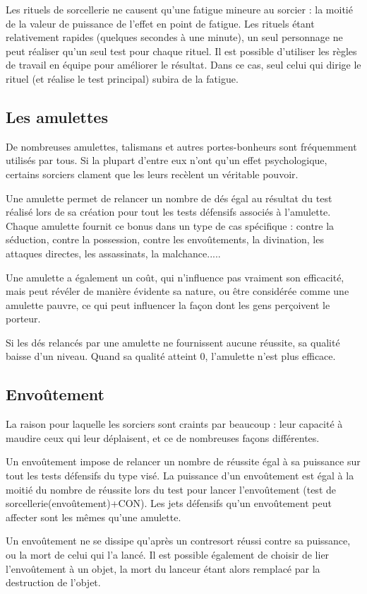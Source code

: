 \documentclass[10pt,a4paper,twocolumn]{book}
\begin{document}
Les rituels de sorcellerie ne causent qu'une fatigue mineure au  sorcier : la moitié de la valeur de puissance de l'effet en point de fatigue.
Les rituels étant relativement rapides (quelques secondes à une minute), un seul personnage ne peut réaliser qu'un seul test pour chaque rituel. Il est possible d'utiliser les règles de travail en équipe pour améliorer le résultat. Dans ce cas, seul celui qui dirige le rituel (et réalise le test principal) subira de la fatigue.
\subsection*{Les amulettes}
De nombreuses amulettes, talismans et autres portes-bonheurs sont fréquemment utilisés par tous. Si la plupart d'entre eux n'ont qu'un effet psychologique, certains sorciers clament que les leurs recèlent un véritable pouvoir.

Une amulette permet de relancer un nombre de dés égal au résultat du test réalisé lors de sa création pour tout les tests défensifs associés à l'amulette. Chaque amulette fournit ce bonus dans un type de cas spécifique : contre la séduction, contre la possession, contre les envoûtements, la divination, les attaques directes, les assassinats, la malchance..... 

Une amulette a également un coût, qui n'influence pas vraiment son efficacité, mais peut révéler de manière évidente sa nature, ou être considérée comme une amulette pauvre, ce qui peut influencer la façon dont les gens perçoivent le porteur.

Si les dés relancés par une amulette ne fournissent aucune réussite, sa qualité baisse d'un niveau. Quand sa qualité atteint 0, l'amulette n'est plus efficace. 
\subsection*{Envoûtement}
La raison pour laquelle les sorciers sont craints par beaucoup : leur capacité à maudire ceux qui leur déplaisent, et ce de nombreuses façons différentes.

Un envoûtement impose de relancer un nombre de réussite égal à sa puissance sur tout les tests défensifs du type visé. La puissance d'un envoûtement est égal à la moitié du nombre de réussite lors du test pour lancer l'envoûtement (test de sorcellerie(envoûtement)+CON). Les jets défensifs qu'un envoûtement peut affecter sont les mêmes qu'une amulette.

Un envoûtement ne se dissipe qu'après un contresort réussi contre sa puissance, ou la mort de celui qui l'a lancé. Il est possible également de choisir de lier l'envoûtement à un objet, la mort du lanceur étant alors remplacé par la destruction de l'objet.
\end{document}
